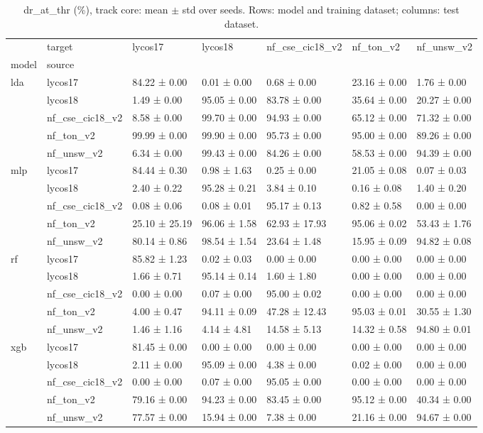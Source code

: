 \begin{table}
\caption{dr_at_thr (\%), track core: mean $\pm$ std over seeds. Rows: model and training dataset; columns: test dataset.}
\label{tab:matrix_core_dr_at_thr}
\begin{tabular}{lllllll}
\toprule
 & target & lycos17 & lycos18 & nf_cse_cic18_v2 & nf_ton_v2 & nf_unsw_v2 \\
model & source &  &  &  &  &  \\
\midrule
\multirow[t]{5}{*}{lda} & lycos17 & 84.22 ± 0.00 & 0.01 ± 0.00 & 0.68 ± 0.00 & 23.16 ± 0.00 & 1.76 ± 0.00 \\
 & lycos18 & 1.49 ± 0.00 & 95.05 ± 0.00 & 83.78 ± 0.00 & 35.64 ± 0.00 & 20.27 ± 0.00 \\
 & nf_cse_cic18_v2 & 8.58 ± 0.00 & 99.70 ± 0.00 & 94.93 ± 0.00 & 65.12 ± 0.00 & 71.32 ± 0.00 \\
 & nf_ton_v2 & 99.99 ± 0.00 & 99.90 ± 0.00 & 95.73 ± 0.00 & 95.00 ± 0.00 & 89.26 ± 0.00 \\
 & nf_unsw_v2 & 6.34 ± 0.00 & 99.43 ± 0.00 & 84.26 ± 0.00 & 58.53 ± 0.00 & 94.39 ± 0.00 \\
\cline{1-7}
\multirow[t]{5}{*}{mlp} & lycos17 & 84.44 ± 0.30 & 0.98 ± 1.63 & 0.25 ± 0.00 & 21.05 ± 0.08 & 0.07 ± 0.03 \\
 & lycos18 & 2.40 ± 0.22 & 95.28 ± 0.21 & 3.84 ± 0.10 & 0.16 ± 0.08 & 1.40 ± 0.20 \\
 & nf_cse_cic18_v2 & 0.08 ± 0.06 & 0.08 ± 0.01 & 95.17 ± 0.13 & 0.82 ± 0.58 & 0.00 ± 0.00 \\
 & nf_ton_v2 & 25.10 ± 25.19 & 96.06 ± 1.58 & 62.93 ± 17.93 & 95.06 ± 0.02 & 53.43 ± 1.76 \\
 & nf_unsw_v2 & 80.14 ± 0.86 & 98.54 ± 1.54 & 23.64 ± 1.48 & 15.95 ± 0.09 & 94.82 ± 0.08 \\
\cline{1-7}
\multirow[t]{5}{*}{rf} & lycos17 & 85.82 ± 1.23 & 0.02 ± 0.03 & 0.00 ± 0.00 & 0.00 ± 0.00 & 0.00 ± 0.00 \\
 & lycos18 & 1.66 ± 0.71 & 95.14 ± 0.14 & 1.60 ± 1.80 & 0.00 ± 0.00 & 0.00 ± 0.00 \\
 & nf_cse_cic18_v2 & 0.00 ± 0.00 & 0.07 ± 0.00 & 95.00 ± 0.02 & 0.00 ± 0.00 & 0.00 ± 0.00 \\
 & nf_ton_v2 & 4.00 ± 0.47 & 94.11 ± 0.09 & 47.28 ± 12.43 & 95.03 ± 0.01 & 30.55 ± 1.30 \\
 & nf_unsw_v2 & 1.46 ± 1.16 & 4.14 ± 4.81 & 14.58 ± 5.13 & 14.32 ± 0.58 & 94.80 ± 0.01 \\
\cline{1-7}
\multirow[t]{5}{*}{xgb} & lycos17 & 81.45 ± 0.00 & 0.00 ± 0.00 & 0.00 ± 0.00 & 0.00 ± 0.00 & 0.00 ± 0.00 \\
 & lycos18 & 2.11 ± 0.00 & 95.09 ± 0.00 & 4.38 ± 0.00 & 0.02 ± 0.00 & 0.00 ± 0.00 \\
 & nf_cse_cic18_v2 & 0.00 ± 0.00 & 0.07 ± 0.00 & 95.05 ± 0.00 & 0.00 ± 0.00 & 0.00 ± 0.00 \\
 & nf_ton_v2 & 79.16 ± 0.00 & 94.23 ± 0.00 & 83.45 ± 0.00 & 95.12 ± 0.00 & 40.34 ± 0.00 \\
 & nf_unsw_v2 & 77.57 ± 0.00 & 15.94 ± 0.00 & 7.38 ± 0.00 & 21.16 ± 0.00 & 94.67 ± 0.00 \\
\cline{1-7}
\bottomrule
\end{tabular}
\end{table}
